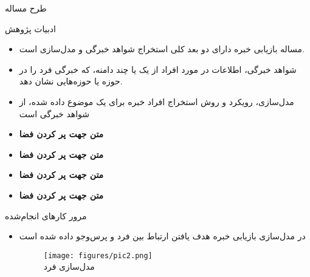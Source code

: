 \documentclass[final,hyperref={pdfpagelabels=false}]{beamer}
\begin{document}
\begin{frame}[t]
\begin{columns}[t]
\begin{column}{.465\textwidth}
\begin{block}{\timesroman طرح مساله}
\end{block}




\begin{block}{ادبیات پژوهش}
\begin{itemize}
\item
مساله بازیابی خبره دارای دو بعد کلی استخراج شواهد خبرگی و مدل‌سازی است.


\item
شواهد خبرگی، اطلاعات در مورد افراد از یک یا چند دامنه، که خبرگی فرد را در حوزه یا حوزه‌هایی نشان دهد.


\item
مدل‌سازی، رویکرد و روش استخراج افراد خبره برای یک موضوع داده شده، از شواهد خبرگی است

\item {\textbf{متن جهت پر کردن فضا}}
\item {\textbf{متن جهت پر کردن فضا}}
\item {\textbf{متن جهت پر کردن فضا}}
\item {\textbf{متن جهت پر کردن فضا}}
\end{itemize}


\end{block}


\begin{block}{مرور کار‌های انجام‌شده}

\begin{itemize}

\item در مدل‌سازی بازیابی خبره هدف یافتن ارتباط بین فرد و پرس‌و‌جو داده شده است

\begin{figure}
\centering
\texttt{[image: figures/pic2.png]}
\\ {\small مدل‌سازی فرد
}
\end{figure}


\end{itemize}
\end{block}
\end{column}
\end{columns}
\end{frame}
\end{document}
